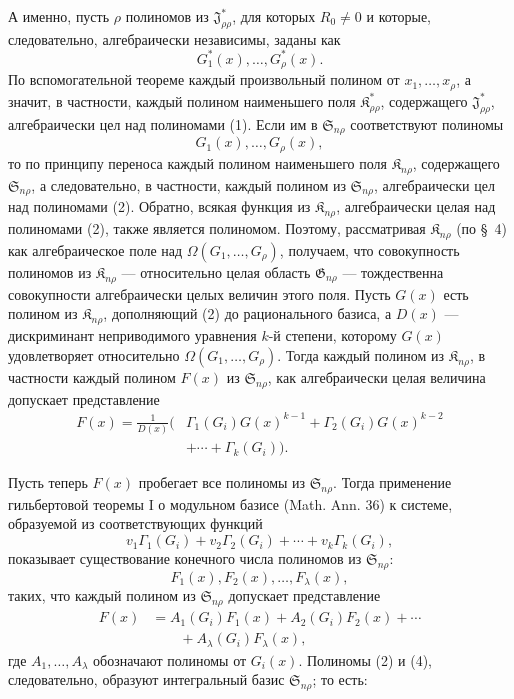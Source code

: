\documentclass[11pt]{article}
\providecommand{\Kfield}{\mathfrak{K}}
\providecommand{\Ssys}{\mathfrak{S}}
\providecommand{\Jdom}{\mathfrak{J}}
\providecommand{\Gdom}{\mathfrak{G}}
\begin{document}
А именно, пусть $\rho$ полиномов из $\Jdom^*_{\rho\rho}$, для которых $R_0\ne0$ и которые, следовательно, алгебраически независимы, заданы как
\begin{equation}
  G_1^*(x),\ldots,G_\rho^*(x).
\tag{1}
\end{equation}
По вспомогательной теореме каждый произвольный полином от $x_1,\ldots,x_\rho$, а значит, в частности, каждый полином наименьшего поля $\Kfield^*_{\rho\rho}$, содержащего $\Jdom^*_{\rho\rho}$, алгебраически цел над полиномами (1). Если им в $\Ssys_{n\rho}$ соответствуют полиномы
\begin{equation}
  G_1(x),\ldots,G_\rho(x),
\tag{2}
\end{equation}
то по принципу переноса каждый полином наименьшего поля $\Kfield_{n\rho}$, содержащего $\Ssys_{n\rho}$, а следовательно, в частности, каждый полином из $\Ssys_{n\rho}$, алгебраически цел над полиномами (2). Обратно, всякая функция из $\Kfield_{n\rho}$, алгебраически целая над полиномами (2), также является полиномом. Поэтому, рассматривая $\Kfield_{n\rho}$ (по \S\ 4) как алгебраическое поле над $\Omega(G_1,\ldots,G_\rho)$, получаем, что совокупность полиномов из $\Kfield_{n\rho}$ --- относительно целая область $\Gdom_{n\rho}$ --- тождественна совокупности алгебраически целых величин этого поля. Пусть $G(x)$ есть полином из $\Kfield_{n\rho}$, дополняющий (2) до рационального базиса, а $D(x)$ --- дискриминант неприводимого уравнения $k$-й степени, которому $G(x)$ удовлетворяет относительно $\Omega(G_1,\ldots,G_\rho)$. Тогда каждый полином из $\Kfield_{n\rho}$, в частности каждый полином $F(x)$ из $\Ssys_{n\rho}$, как алгебраически целая величина допускает представление
\begin{equation}
\begin{split}
  F(x)=\frac{1}{D(x)}\big(&\Gamma_1(G_i)G(x)^{k-1}
    +\Gamma_2(G_i)G(x)^{k-2}\\
    &+\cdots+\Gamma_k(G_i)\big).
\end{split}
\tag{3}
\end{equation}

Пусть теперь $F(x)$ пробегает все полиномы из $\Ssys_{n\rho}$. Тогда применение гильбертовой теоремы I о модульном базисе (Math. Ann. 36) к системе, образуемой из соответствующих функций
\[
  v_1\Gamma_1(G_i)+v_2\Gamma_2(G_i)+\cdots+v_k\Gamma_k(G_i),
\]
показывает существование конечного числа полиномов из $\Ssys_{n\rho}$:
\begin{equation}
  F_1(x),F_2(x),\ldots,F_\lambda(x),
\tag{4}
\end{equation}
таких, что каждый полином из $\Ssys_{n\rho}$ допускает представление
\begin{equation}
\begin{aligned}
  F(x)&=A_1(G_i)F_1(x)+A_2(G_i)F_2(x)+\cdots\\
      &\qquad +A_\lambda(G_i)F_\lambda(x),
\end{aligned}
\tag{5}
\end{equation}
где $A_1,\ldots,A_\lambda$ обозначают полиномы от $G_i(x)$. Полиномы (2) и (4), следовательно, образуют интегральный базис $\Ssys_{n\rho}$; то есть:
\end{document}
